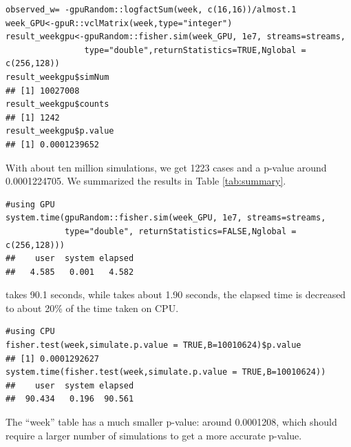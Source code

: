 \documentclass[article,nojss]{jss}\usepackage[]{graphicx}\usepackage[]{color}
\makeatletter
\newenvironment{kframe}{%
 \def\at@end@of@kframe{}%
 \ifinner\ifhmode%
  \def\at@end@of@kframe{\end{minipage}}%
  \begin{minipage}{\columnwidth}%
 \fi\fi%
 \def\FrameCommand##1{\hskip\@totalleftmargin \hskip-\fboxsep
 \colorbox{shadecolor}{##1}\hskip-\fboxsep
     \hskip-\linewidth \hskip-\@totalleftmargin \hskip\columnwidth}%
 \MakeFramed {\advance\hsize-\width
   \@totalleftmargin\z@ \linewidth\hsize
   \@setminipage}}%
 {\par\unskip\endMakeFramed%
 \at@end@of@kframe}
\newenvironment{knitrout}{}{} %
\newcommand{\fct}[1]{\code{#1()}}
\makeatother
\begin{document}
\begin{knitrout}
\color{fgcolor}\begin{kframe}
\begin{verbatim}
observed_w= -gpuRandom::logfactSum(week, c(16,16))/almost.1
week_GPU<-gpuR::vclMatrix(week,type="integer")
result_weekgpu<-gpuRandom::fisher.sim(week_GPU, 1e7, streams=streams,
                type="double",returnStatistics=TRUE,Nglobal = c(256,128))
result_weekgpu$simNum
## [1] 10027008
result_weekgpu$counts
## [1] 1242
result_weekgpu$p.value
## [1] 0.0001239652
\end{verbatim}
\end{kframe}
\end{knitrout}
With about ten million simulations, we get 1223 cases and a p-value around 0.0001224705. We summarized the results in Table \ref{tab:summary}.
\begin{knitrout}
\color{fgcolor}\begin{kframe}
\begin{verbatim}
#using GPU
system.time(gpuRandom::fisher.sim(week_GPU, 1e7, streams=streams,
            type="double", returnStatistics=FALSE,Nglobal = c(256,128)))
##    user  system elapsed 
##   4.585   0.001   4.582
\end{verbatim}
\end{kframe}
\end{knitrout}
\fct{stats::fisher.test} takes 90.1 seconds, while \fct{fisher.sim} takes about 1.90 seconds, the elapsed time is decreased to about 20\% of the time taken on CPU. 


\begin{knitrout}
\color{fgcolor}\begin{kframe}
\begin{verbatim}
#using CPU
fisher.test(week,simulate.p.value = TRUE,B=10010624)$p.value
## [1] 0.0001292627
system.time(fisher.test(week,simulate.p.value = TRUE,B=10010624))
##    user  system elapsed 
##  90.434   0.196  90.561
\end{verbatim}
\end{kframe}
\end{knitrout}
The ``week'' table has a much smaller p-value: around 0.0001208, which should require a larger number of simulations to get a more accurate p-value.
\end{document}
